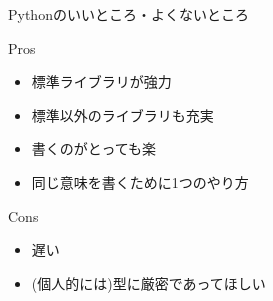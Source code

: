 \documentclass[12pt, dvipdfmx]{beamer}
\begin{document}
\begin{frame}{Pythonのいいところ・よくないところ}
    \begin{alertblock}{Pros}
        \begin{itemize}
            \item 標準ライブラリが強力
            \item 標準以外のライブラリも充実
            \item 書くのがとっても楽
            \item 同じ意味を書くために1つのやり方
        \end{itemize}
    \end{alertblock}
    \begin{block}{Cons}
        \begin{itemize}
            \item 遅い
            \item (個人的には)型に厳密であってほしい    
        \end{itemize}
    \end{block}
\end{frame}
\end{document}
